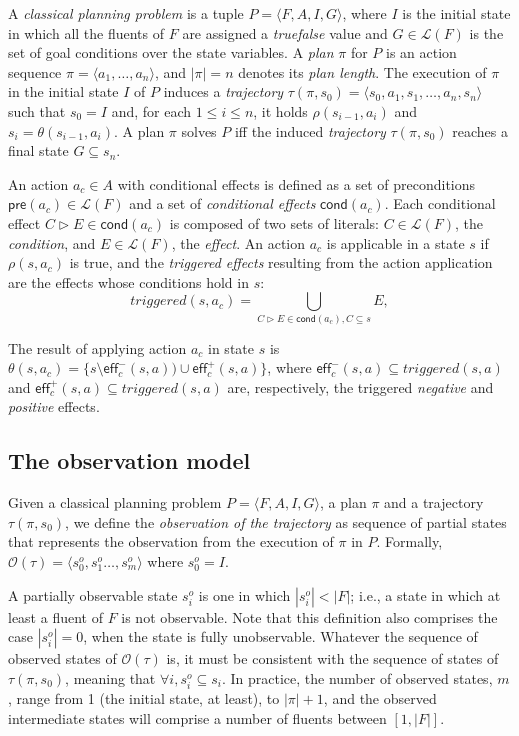 \documentclass{article}
\newcommand{\tup}[1]{{\langle #1 \rangle}}
\newcommand{\pre}{\mathsf{pre}}     %
\newcommand{\eff}{\mathsf{eff}}     %
\newcommand{\cond}{\mathsf{cond}}   %
\begin{document}
A {\em classical planning problem} is a tuple $P=\tup{F,A,I,G}$, where $I$ is the initial state in which all the fluents of $F$ are assigned a {\em true\textbar false} value and $G\in\mathcal{L}(F)$ is the set of goal conditions over the state variables. A {\em plan} $\pi$ for $P$ is an action sequence $\pi=\tup{a_1, \ldots, a_n}$, and $|\pi|=n$ denotes its {\em plan length}. The execution of $\pi$ in the initial state $I$ of $P$ induces a {\em trajectory} $\tau(\pi,s_0)=\tup{s_0, a_1, s_1, \ldots, a_n, s_n}$ such that $s_0=I$ and, for each {\small $1\leq i\leq n$}, it holds $\rho(s_{i-1},a_i)$ and $s_i=\theta(s_{i-1},a_i)$. A plan $\pi$ solves $P$ iff the induced {\em trajectory} $\tau(\pi,s_0)$ reaches a final state $G \subseteq s_n$.

An action $a_c\in A$ with conditional effects is defined as a set of preconditions $\pre(a_c)\in\mathcal{L}(F)$ and a set of {\em conditional effects} $\cond(a_c)$. Each conditional effect $C\rhd E\in\cond(a_c)$ is composed of two sets of literals: $C\in\mathcal{L}(F)$, the {\em condition}, and $E\in\mathcal{L}(F)$, the {\em effect}. An action $a_c$ is applicable in a state $s$ if $\rho(s,a_c)$ is true, and the {\em triggered effects} resulting from the action application are the effects whose conditions hold in $s$:
\[
triggered(s,a_c)=\bigcup_{C\rhd E\in\cond(a_c),C\subseteq s} E,
\]

The result of applying action $a_c$ in state $s$ is $\theta(s,a_c)=\{s\setminus\eff_c^-(s,a))\cup\eff_c^+(s,a)\}$, where $\eff_c^-(s,a)\subseteq triggered(s,a)$ and $\eff_c^+(s,a)\subseteq triggered(s,a)$ are, respectively, the triggered {\em negative} and {\em positive} effects.


\subsection{The observation model}
Given a classical planning problem $P=\tup{F,A,I,G}$, a plan $\pi$ and a trajectory $\tau(\pi,s_0)$, we define the \emph{observation of the trajectory} as sequence of partial states that represents the observation from the execution of $\pi$ in $P$. Formally, $\mathcal{O}(\tau)=\tup{s_0^o,s_1^o \ldots , s_m^o}$ where $s_0^o=I$.

A partially observable state $s_i^o$ is one in which $|s_i^o| < |F|$; i.e., a state in which at least a fluent of $F$ is not observable. Note that this definition also comprises the case $|s_i^o| = 0$, when the state is fully unobservable. Whatever the sequence of observed states of $\mathcal{O}(\tau)$ is, it must be consistent with the sequence of states of $\tau(\pi,s_0)$, meaning that $\forall i, s_i^o \subseteq s_i$. In practice, the number of observed states, $m$, range from 1 (the initial state, at least), to $|\pi|+1$, and the observed intermediate states will comprise a number of fluents between $[1,|F|]$.
\end{document}
